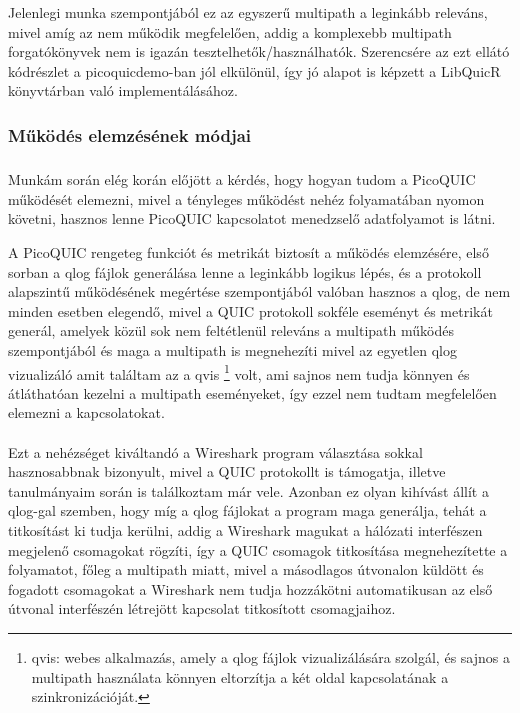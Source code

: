 \documentclass[a4paper,oneside]{article}
\begin{document}
Jelenlegi munka szempontjából ez az egyszerű multipath a leginkább releváns,
mivel amíg az nem működik megfelelően, addig a komplexebb multipath forgatókönyvek nem is igazán tesztelhetők/használhatók.
Szerencsére az ezt ellátó kódrészlet a picoquicdemo-ban jól elkülönül, így jó alapot is képzett
a LibQuicR könyvtárban való implementálásához.

\subsubsection{Működés elemzésének módjai}

\subparagraph{}

Munkám során elég korán előjött a kérdés, hogy hogyan tudom a PicoQUIC működését elemezni, mivel
a tényleges működést nehéz folyamatában nyomon követni, hasznos lenne PicoQUIC kapcsolatot menedzselő adatfolyamot is látni.

A PicoQUIC rengeteg funkciót és metrikát biztosít a működés elemzésére, 
első sorban a qlog fájlok generálása lenne a leginkább logikus lépés, és
a protokoll alapszintű működésének megértése szempontjából valóban hasznos 
a qlog, de nem minden esetben elegendő, mivel a QUIC protokoll
sokféle eseményt és metrikát generál, amelyek közül sok nem feltétlenül releváns a 
multipath működés szempontjából és maga a multipath is megnehezíti mivel az egyetlen 
qlog vizualizáló amit találtam az a qvis \cite{qvis} \footnote{qvis: webes alkalmazás, amely a qlog 
fájlok vizualizálására szolgál, és sajnos a multipath használata könnyen eltorzítja a két oldal 
kapcsolatának a szinkronizációját.} volt, ami sajnos nem tudja könnyen és átláthatóan kezelni a multipath eseményeket, 
így ezzel nem tudtam megfelelően elemezni a kapcsolatokat.

\paragraph{}
Ezt a nehézséget kiváltandó a Wireshark program választása sokkal hasznosabbnak bizonyult, mivel
a QUIC protokollt is támogatja, illetve tanulmányaim során is találkoztam már vele. 
Azonban ez olyan kihívást állít a qlog-gal szemben, hogy míg a 
qlog fájlokat a program maga generálja, tehát a titkosítást ki tudja kerülni, 
addig a Wireshark magukat a hálózati interfészen megjelenő csomagokat rögzíti, 
így a QUIC csomagok titkosítása megnehezítette a folyamatot, főleg a multipath 
miatt, mivel a másodlagos útvonalon küldött és fogadott csomagokat a Wireshark 
nem tudja hozzákötni automatikusan az első útvonal interfészén létrejött kapcsolat titkosított csomagjaihoz.
\end{document}
